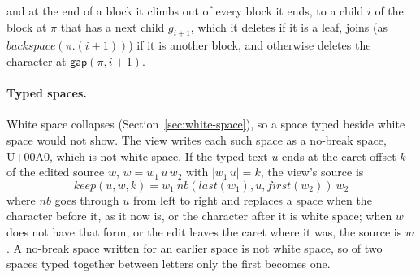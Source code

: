 \documentclass[11pt]{article}
\numberwithin{equation}{section}
\newcommand{\kw}[1]{\ensuremath{\mathsf{#1}}}
\begin{document}
and at the end of a block it climbs out of every block it ends, to a child
$i$ of the block at $\pi$ that has a next child $g_{i+1}$, which it
deletes if it is a leaf, joins (as $\mathit{backspace}(\pi.(i{+}1))$) if
it is another block, and otherwise deletes the character at
$\kw{gap}(\pi, i{+}1)$.

\paragraph{Typed spaces.}  White space collapses (Section~\ref{sec:white-space}),
so a space typed beside white space would not show.  The view writes each
such space as a no-break space, U+00A0, which is not white space.  If the
typed text $u$ ends at the caret offset $k$ of the edited source $w$, $w =
w_1\,u\,w_2$ with $|w_1\,u| = k$, the view's source is
\begin{equation}\label{eq:view-spaces}
\mathit{keep}(u, w, k) = w_1\ \mathit{nb}(\mathit{last}(w_1), u, \mathit{first}(w_2))\ w_2
\end{equation}
where $\mathit{nb}$ goes through $u$ from left to right and replaces a space
when the character before it, as it now is, or the character after it is
white space; when $w$ does not have that form, or the edit leaves the
caret where it was, the source is $w$.  A no-break space written for an
earlier space is not white space, so of two spaces typed together between
letters only the first becomes one.
\end{document}
